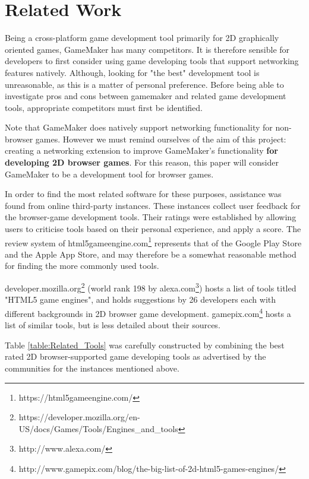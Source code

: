 \documentclass[bsc,frontabs,twoside,singlespacing,parskip,deptreport]{infthesis}     %
\begin{document}
\section{Related Work}
Being a cross-platform game development tool primarily for 2D graphically oriented games, GameMaker has many competitors. It is therefore sensible for developers to first consider using game developing tools that support networking features natively. Although, looking for "the best" development tool is unreasonable, as this is a matter of personal preference. Before being able to investigate pros and cons between gamemaker and related game development tools, appropriate competitors must first be identified.

Note that GameMaker does natively support networking functionality for non-browser games. However we must remind ourselves of the aim of this project: creating a networking extension to improve GameMaker's functionality \textbf{for developing 2D browser games}. For this reason, this paper will consider GameMaker to be a development tool for browser games.

In order to find the most related software for these purposes, assistance was found from online third-party instances. These instances collect user feedback for the browser-game development tools. Their ratings were established by allowing users to criticise tools based on their personal experience, and apply a score. The review system of html5gameengine.com\footnote{https://html5gameengine.com/} represents that of the Google Play Store\cite{Google_Play_Store} and the Apple App Store\cite{Apple_App_Store}, and may therefore be a somewhat reasonable method for finding the more commonly used tools.

developer.mozilla.org\footnote{https://developer.mozilla.org/en-US/docs/Games/Tools/Engines\_and\_tools} (world rank 198 by alexa.com\footnote{http://www.alexa.com/}) hosts a list of tools titled "HTML5 game engines", and holds suggestions by 26 developers each with different backgrounds in 2D browser game development. gamepix.com\footnote{http://www.gamepix.com/blog/the-big-list-of-2d-html5-games-engines/} hosts a list of similar tools, but is less detailed about their sources.

Table \ref{table:Related_Tools} was carefully constructed by combining the best rated 2D browser-supported game developing tools as advertised by the communities for the instances mentioned above.
\end{document}

